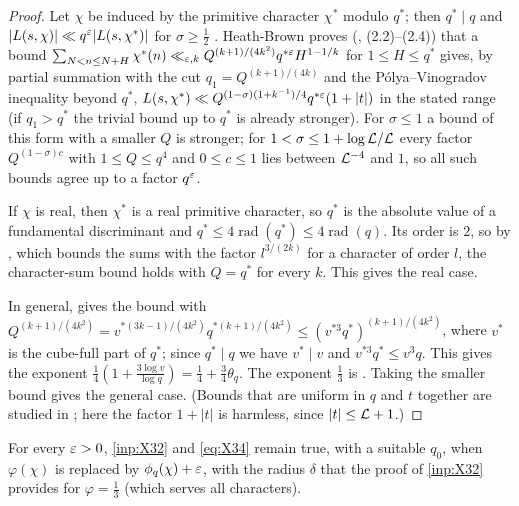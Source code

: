 \begin{proof}
Let $\chi$ be induced by the primitive character $\chi^*$ modulo $q^*$; then $q^*\mid q$ and
$|L(s,\chi)|\ll q^\varepsilon|L(s,\chi^*)|$ for $\sigma\ge\frac12$ \cite[p.~10]{HeathBrown1992zero}. Heath-Brown
proves (\cite[pp.~9--10]{HeathBrown1992zero}, (2.2)--(2.4)) that a bound
$\sum_{N<n\le N+H}\chi^*(n)\ll_{\varepsilon,k}Q^{(k+1)/(4k^2)}q^{*\varepsilon}H^{1-1/k}$ for $1\le H\le q^*$ gives, by partial
summation with the cut $q_1=Q^{(k+1)/(4k)}$ and the P\'olya--Vinogradov inequality beyond $q^*$,
$L(s,\chi^*)\ll Q^{(1-\sigma)(1+k^{-1})/4}q^{*\varepsilon}(1+|t|)$ in the stated range (if $q_1>q^*$ the trivial
bound up to $q^*$ is already stronger). For $\sigma\le1$ a bound of this form with a smaller $Q$ is
stronger; for $1<\sigma\le1+\log\mathcal{L}/\mathcal{L}$ every factor $Q^{(1-\sigma)c}$ with $1\le Q\le q^4$ and
$0\le c\le1$ lies between $\mathcal{L}^{-4}$ and $1$, so all such bounds agree up to a factor $q^{\varepsilon}$.

If $\chi$ is real, then $\chi^*$ is a real primitive character, so $q^*$ is the absolute value of a
fundamental discriminant and $q^*\le4\operatorname{rad}(q^*)\le4\operatorname{rad}(q)$. Its order is $2$, so by \cite[Lemma~2.4]{HeathBrown1992zero}, which bounds the
sums with the factor $l^{3/(2k)}$ for a character of order $l$, the character-sum bound holds with
$Q=q^*$ for every $k$. This gives the real case.

In general, \cite[Lemma~2.3]{HeathBrown1992zero} gives the bound with
$Q^{(k+1)/(4k^2)}=v^{*(3k-1)/(4k^2)}q^{*(k+1)/(4k^2)}\le(v^{*3}q^*)^{(k+1)/(4k^2)}$, where $v^*$ is the
cube-full part of $q^*$; since $q^*\mid q$ we have $v^*\mid v$ and $v^{*3}q^*\le v^3q$. This gives the
exponent $\frac14(1+\frac{3\log v}{\log q})=\frac14+\frac34\theta_q$. The exponent $\frac13$ is
\cite[Lemma~2.5]{HeathBrown1992zero}. Taking the smaller bound gives the general case. (Bounds that are uniform in $q$ and $t$
together are studied in \cite{HeathBrown1978hybrid}; here the factor $1+|t|$ is harmless, since
$|t|\le\mathcal{L}+1$.)
\end{proof}

\begin{lemma}\label{lem:explicitphi}
For every $\varepsilon>0$, \cref{inp:X32} and \eqref{eq:X34} remain true, with a suitable $q_0$, when $\varphi(\chi)$ is replaced by
$\phi_q(\chi)+\varepsilon$, with the radius $\delta$ that the proof of \cref{inp:X32} provides for $\varphi=\frac13$ (which
serves all characters).
\end{lemma}

